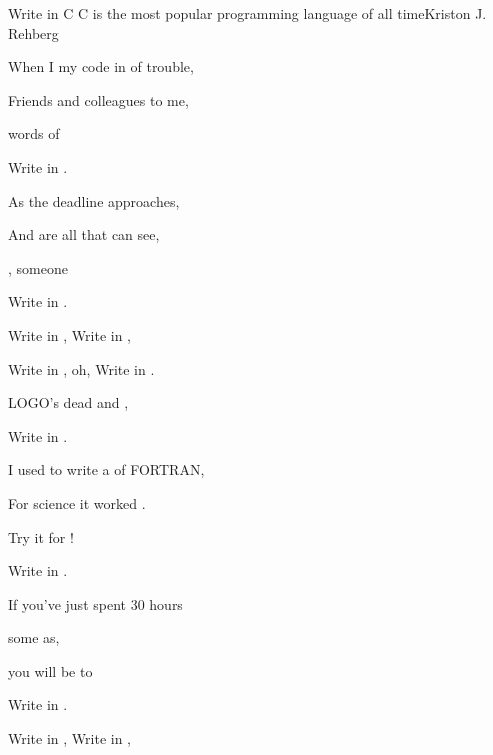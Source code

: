 \begin{SBSong}{Write in C}
  {C is the most popular programming language of all time}{Kriston J. Rehberg}
  
  \begin{SBVerse}
    When I  my code in  of trouble,

     Friends and colleagues  to me,

     words of 

    Write in . 

    As the deadline  approaches,

    And  are all that  can see,

    , someone 

    Write in . 
  \end{SBVerse}
  \begin{SBChorus}
    Write in , Write in ,

    Write in , oh, Write in .

    LOGO's dead and ,

    Write in . 
  \end{SBChorus}
  \begin{SBVerse}
    I used to write a  of FORTRAN,

     For science it worked .

    Try  it for !

    Write in . 

    If you've just spent  30 hours

     some as,

     you will be  to

    Write in . 
  \end{SBVerse}
  \CBPageBrk
  \begin{SBChorus}
    Write in , Write in ,


\end{SBChorus}
\end{SBSong}
